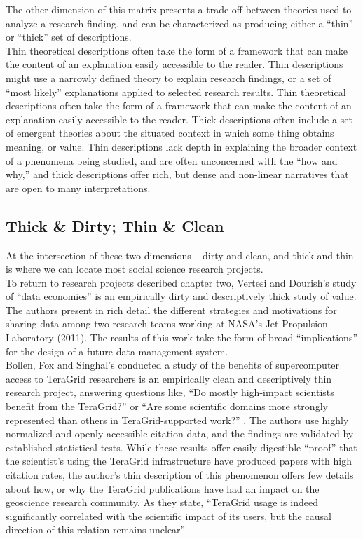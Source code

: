 \documentclass[thesis,tocnosub,noragright,centerchapter,12pt]{uiucecethesis09}
\begin{document}
The other dimension of this matrix presents a trade-off between theories
used to analyze a research finding, and can be characterized as
producing either a ``thin'' or ``thick'' set of descriptions.\\

\parindent Thin theoretical descriptions often take the form of a framework that
can make the content of an explanation easily accessible to the reader.
Thin descriptions might use a narrowly defined theory to explain
research findings, or a set of ``most likely'' explanations applied to
selected research results. Thin theoretical descriptions often take the form of a framework that
can make the content of an explanation easily accessible to the reader. Thick descriptions often include a set of emergent theories about the
situated context in which some thing obtains meaning, or value. Thin descriptions lack depth in explaining the broader context of a
phenomena being studied, and are often unconcerned with the ``how and
why,'' and thick descriptions offer rich, but dense and non-linear narratives that
are open to many interpretations. 

\subsection*{Thick \& Dirty; Thin \& Clean}

At the intersection of these two dimensions -- dirty and clean, and
thick and thin- is where we can locate most social science research
projects.\\

To return to research projects described chapter two, Vertesi and
Dourish's study of ``data economies'' is an empirically dirty and
descriptively thick study of value. The authors present in rich detail
the different strategies and motivations for sharing data among two
research teams working at NASA's Jet Propulsion Laboratory (2011). The
results of this work take the form of broad ``implications'' for the
design of a future data management system.\\

Bollen, Fox and Singhal's conducted a study of the benefits of
supercomputer access to TeraGrid researchers is an empirically clean and
descriptively thin research project, answering questions like, ``Do
mostly high-impact scientists benefit from the TeraGrid?'' or ``Are some
scientific domains more strongly represented than others in
TeraGrid-supported work?'' \citeyearpar{bollen2011and}. The authors use highly normalized and
openly accessible citation data, and the findings are validated by
established statistical tests. While these results offer easily
digestible ``proof'' that the scientist's using the TeraGrid infrastructure have produced
papers with high citation rates, the author's thin
description of this phenomenon offers few details about how, or why the
TeraGrid publications have had an impact on the geoscience research
community. As they state, ``TeraGrid usage is indeed
significantly correlated with the scientific impact of its users, but
the causal direction of this relation remains unclear'' \citep[p. 11]{bollen2011and}\\
\end{document}
